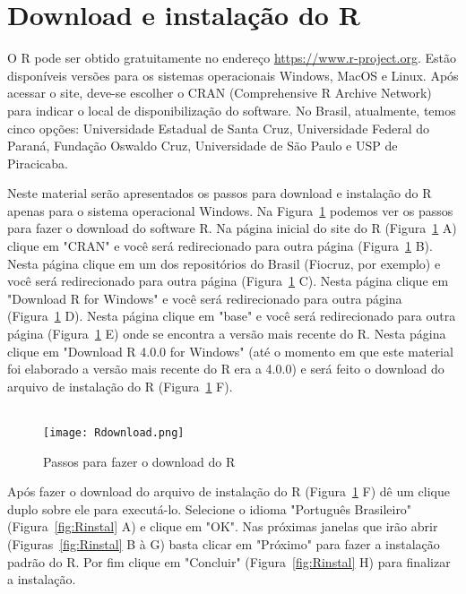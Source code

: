 \documentclass[11pt,fleqn]{book} %
\begin{document}

\section{Download e instalação do R}

O R pode ser obtido gratuitamente no endereço \url{https://www.r-project.org}. Estão disponíveis versões para os sistemas operacionais Windows, MacOS e Linux. Após acessar o site, deve-se escolher o CRAN (Comprehensive R Archive Network) para indicar o local de disponibilização do software. No Brasil, atualmente, temos cinco opções: Universidade Estadual de Santa Cruz, Universidade Federal do Paraná, Fundação Oswaldo Cruz, Universidade de São Paulo e USP de Piracicaba. 

Neste material serão apresentados os passos para download e instalação do R apenas para o sistema operacional Windows. Na Figura~\ref{fig:Rdownload} podemos ver os passos para fazer o download do software R. Na página inicial do site do R (Figura~\ref{fig:Rdownload} A) clique em "CRAN" e você será redirecionado para outra página (Figura~\ref{fig:Rdownload} B). Nesta página clique em um dos repositórios do Brasil (Fiocruz, por exemplo) e você será redirecionado para outra página (Figura~\ref{fig:Rdownload} C). Nesta página clique em "Download R for Windows"  e você será redirecionado para outra página (Figura~\ref{fig:Rdownload} D). Nesta página clique em "base" e você será redirecionado para outra página (Figura~\ref{fig:Rdownload} E) onde se encontra a versão mais recente do R. Nesta página clique em "Download R 4.0.0 for Windows" (até o momento em que este material foi elaborado a versão mais recente do R era a 4.0.0) e será feito o download do arquivo de instalação do R (Figura~\ref{fig:Rdownload} F). \\ \\


\begin{figure}[h!]
\centering\texttt{[image: Rdownload.png]}
\setlength{\abovecaptionskip}{0.5pt}
\caption{Passos para fazer o download do R}
\label{fig:Rdownload} %
\end{figure}


Após fazer o download do arquivo de instalação do R (Figura~\ref{fig:Rdownload} F) dê um clique duplo sobre ele para executá-lo. Selecione o idioma "Português Brasileiro" (Figura~\ref{fig:Rinstal} A) e clique em "OK". Nas próximas janelas que irão abrir (Figuras~\ref{fig:Rinstal} B à G) basta clicar em "Próximo" para fazer a instalação padrão do R. Por fim clique em "Concluir" (Figura~\ref{fig:Rinstal} H) para finalizar a instalação. 
\end{document}
